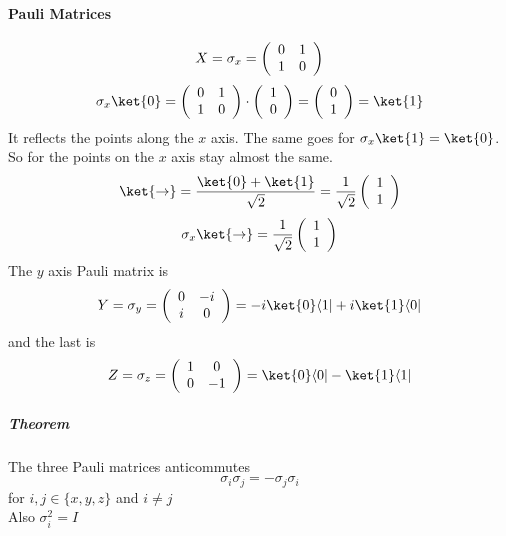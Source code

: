 \documentclass[10pt]{report}
\begin{document}
\paragraph{Pauli Matrices} $$X = \sigma_x = \left(\begin{array}{c c}
0&1\\1&0
\end{array}\right)$$
$$\sigma_x\ket{0} = \left(\begin{array}{c c}
0&1\\1&0
\end{array}\right)\cdot\left(\begin{array}{c}
1\\0
\end{array}\right) = \left(\begin{array}{c}
0\\1
\end{array}\right) =\ket{1}$$
It reflects the points along the $x$ axis. The same goes for $\sigma_x\ket{1} = \ket{0}$.\\
So for the points on the $x$ axis stay almost the same.
$$\ket{\rightarrow} = \frac{\ket{0} + \ket{1}}{\sqrt{2}} = \frac{1}{\sqrt{2}}\left(\begin{array}{c}
1\\1
\end{array}\right)$$
$$\sigma_x\ket{\rightarrow} = \frac{1}{\sqrt{2}}\left(\begin{array}{c}
1\\1
\end{array}\right)$$
The $y$ axis Pauli matrix is $$Y = \sigma_y = \left(\begin{array}{c c}
0&-i\\i&0
\end{array}\right) = -i\ket{0}\langle1| + i \ket{1}\langle0|$$
and the last is $$Z = \sigma_z = \left(\begin{array}{c c}
1&0\\0&-1
\end{array}\right) = \ket{0}\langle0| - \ket{1}\langle1|$$
\subparagraph{Theorem} The three Pauli matrices anticommutes
$$\sigma_i\sigma_j = -\sigma_j\sigma_i$$
for $i,j\in\{x,y,z\}$ and $i\neq j$\\
Also $\sigma_i^2 = I$
\end{document}
